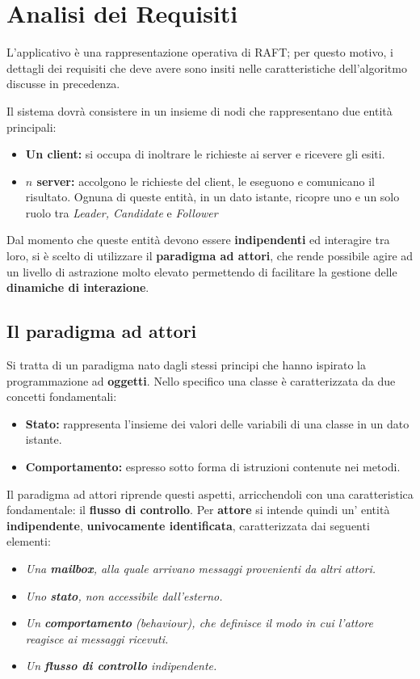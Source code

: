 \section{Analisi dei Requisiti}
L'applicativo è una rappresentazione operativa di RAFT; per questo motivo, i dettagli dei requisiti che deve avere sono insiti nelle caratteristiche dell'algoritmo discusse in precedenza. 

Il sistema dovrà consistere in un insieme di nodi che rappresentano due entità principali:
	\begin{itemize}
		\item \textbf{Un client:} si occupa di inoltrare le richieste ai server e ricevere gli esiti.
		\item \textbf{$n$ server:} accolgono le richieste del client, le eseguono e comunicano il risultato. Ognuna di queste entità, in un dato istante, ricopre uno e un solo ruolo tra \textit{Leader, Candidate} e \textit{Follower}
	\end{itemize}

Dal momento che queste entità devono essere \textbf{indipendenti} ed interagire tra loro, si è scelto di utilizzare il \textbf{paradigma ad attori}, che rende possibile agire ad un livello di astrazione molto elevato permettendo di facilitare la gestione delle \textbf{dinamiche di interazione}.


	\subsection{Il paradigma ad attori} \label{Actors}
	Si tratta di un paradigma nato dagli stessi principi che hanno ispirato la programmazione ad \textbf{oggetti}. Nello specifico una classe è caratterizzata da due concetti fondamentali:
	\begin{itemize}
		\item{\textbf{Stato:}} rappresenta l'insieme dei valori delle variabili di una classe in un dato istante. 
		\item{\textbf{Comportamento:}} espresso sotto forma di istruzioni contenute nei metodi.
	\end{itemize}

	Il paradigma ad attori riprende questi aspetti, arricchendoli con una caratteristica fondamentale: il \textbf{flusso di controllo}. 
	Per \textbf{attore} si intende quindi un' entità \textbf{indipendente}, \textbf{univocamente identificata}, caratterizzata dai seguenti elementi:
	\begin{itemize}
		\item \emph{Una \textbf{mailbox}, alla quale arrivano messaggi provenienti da altri attori.}
		\item \emph{Uno \textbf{stato}, non accessibile dall'esterno.}
		\item \emph{Un \textbf{comportamento} (behaviour), che definisce il modo in cui l'attore reagisce ai messaggi ricevuti.}
		\item \emph{Un \textbf{flusso di controllo} indipendente.}
	\end{itemize}

